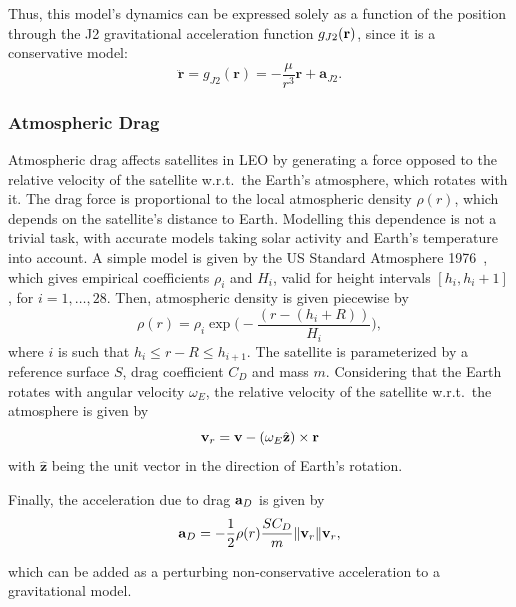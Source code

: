 Thus, this model's dynamics can be expressed solely as a function of the position through the J2 gravitational acceleration function \(g_{J2}(\mathbf{r})\), since it is a conservative model:
\begin{equation}\label{eq:j2_dyn}
    \ddot{\mathbf{r}} = g_{J2}(\mathbf{r}) = -\frac{\mu}{r^3} \mathbf{r} + \mathbf{a}_{J2}.
\end{equation}

\subsubsection{Atmospheric Drag}\label{sssec:drag}

Atmospheric drag affects satellites in LEO by generating a force opposed to the relative velocity of the satellite w.r.t.\ the Earth's atmosphere, which rotates with it. The drag force is proportional to the local atmospheric density \(\rho(r)\), which depends on the satellite's distance to Earth. Modelling this dependence is not a trivial task, with accurate models taking solar activity and Earth's temperature into account. A simple model is given by the US Standard Atmosphere 1976~\cite{curtis2015orbital}, which gives empirical coefficients \(\rho_i\) and \(H_i\), valid for height intervals \([h_i, h_i+1]\), for \(i = 1,\dots, 28\). Then, atmospheric density is given piecewise by
\begin{equation}\label{eq:rho}
    \rho(r) = \rho_i \exp{\big(-\frac{\left(r - (h_i + R)\right)}{H_i}\big)},
\end{equation}
where \(i\) is such that \(h_i \leq r - R \leq h_{i+1}\). The satellite is parameterized by a reference surface \(S\), drag coefficient \(C_D\) and mass \(m\). Considering that the Earth rotates with angular velocity \(\omega_E\), the relative velocity of the satellite w.r.t.\ the atmosphere is given by
\begin{equation}
    \mathbf{v}_{r} = \mathbf{v} - (\omega_E \hat{\mathbf{z}}) \times \mathbf{r}
\end{equation}
with \(\hat{\mathbf{z}}\) being the unit vector in the direction of Earth's rotation.

Finally, the acceleration due to drag \(\mathbf{a}_D\) is given by
\begin{equation}\label{eq:acc_drag}
    \acc_D = - \frac{1}{2} \rho(r) \frac{S C_D}{m} \lVert \vel_r \rVert \vel_r,
\end{equation}

which can be added as a perturbing non-conservative acceleration to a gravitational model.

